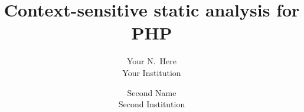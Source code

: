 \documentclass[letterpaper,twocolumn,10pt]{article}
\begin{document}
\date{}

\title{\Large \bf Context-sensitive static analysis for PHP}

\author{
{\rm Your N.\ Here}\\
Your Institution
\and
{\rm Second Name}\\
Second Institution
}

\maketitle

\thispagestyle{empty}




{\footnotesize 
}

\theendnotes
\end{document}
